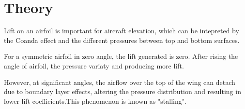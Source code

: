 \section{Theory}
\FloatBarrier %

Lift on an airfoil is important for aircraft elevation, which can be intepreted by the Coanda effect and the different pressures between top and bottom surfaces. 

For a symmetric airfoil in zero angle, the lift generated is zero. 
After rising the angle of airfoil, the pressure variaty and producing more lift. 

However, at significant angles, the airflow over the top of the wing can detach due to boundary layer effects, altering the pressure distribution and resulting in lower lift coefficients.This phenomenon is known as "stalling".




